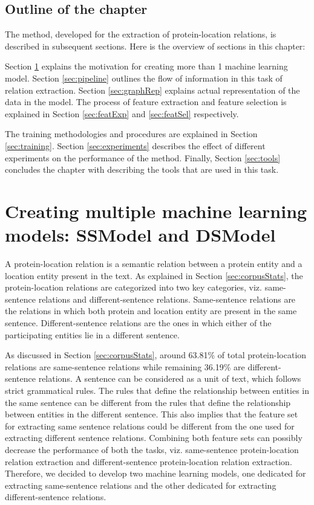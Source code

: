 \subsection*{Outline of the chapter}

The method, developed for the extraction of protein-location relations, is described in subsequent sections. Here is the overview of sections in this chapter: 

Section \ref{sec:ssModeldsModel} explains the motivation for creating more than 1 machine learning model. Section \ref{sec:pipeline} outlines the flow of information in this task of relation extraction. Section \ref{sec:graphRep} explains actual representation of the data in the model. The process of feature extraction and feature selection is explained in Section \ref{sec:featExp} and \ref{sec:featSel} respectively.

The training methodologies and procedures are explained in Section \ref{sec:training}. Section \ref{sec:experiments} describes the effect of different experiments on the performance of the method. Finally, Section \ref{sec:tools} concludes the chapter with describing the tools that are used in this task.

\section{Creating multiple machine learning models: SSModel and DSModel}\label{sec:ssModeldsModel}

A protein-location relation is a semantic relation between a protein entity and a location entity present in the text. As explained in Section \ref{sec:corpusStats}, the protein-location relations are categorized into two key categories, viz. same-sentence relations and different-sentence relations. Same-sentence relations are the relations in which both protein and location entity are present in the same sentence. Different-sentence relations are the ones in which either of the participating entities lie in a different sentence.

As discussed in Section \ref{sec:corpusStats}, around 63.81\% of total protein-location relations are same-sentence relations while remaining 36.19\% are different-sentence relations. A sentence can be considered as a unit of text, which follows strict grammatical rules. The rules that define the relationship between entities in the same sentence can be different from the rules that define the relationship between entities in the different sentence. This also implies that the feature set for extracting same sentence relations could be different from the one used for extracting different sentence relations. Combining both feature sets can possibly decrease the performance of both the tasks, viz. same-sentence protein-location relation extraction and different-sentence protein-location relation extraction. Therefore, we decided to develop two machine learning models, one dedicated for extracting same-sentence relations and the other dedicated for extracting different-sentence relations.

